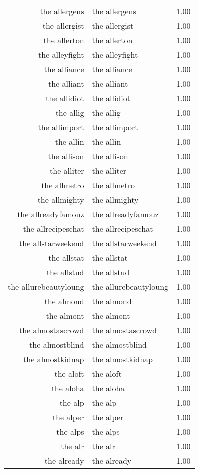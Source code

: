 \begin{table}[ht]
\begin{tabular}{rlr}
  the allergens & the allergens & 1.00 \\ 
  the allergist & the allergist & 1.00 \\ 
  the allerton & the allerton & 1.00 \\ 
  the alleyfight & the alleyfight & 1.00 \\ 
  the alliance & the alliance & 1.00 \\ 
  the alliant & the alliant & 1.00 \\ 
  the allidiot & the allidiot & 1.00 \\ 
  the allig & the allig & 1.00 \\ 
  the allimport & the allimport & 1.00 \\ 
  the allin & the allin & 1.00 \\ 
  the allison & the allison & 1.00 \\ 
  the alliter & the alliter & 1.00 \\ 
  the allmetro & the allmetro & 1.00 \\ 
  the allmighty & the allmighty & 1.00 \\ 
  the allreadyfamouz & the allreadyfamouz & 1.00 \\ 
  the allrecipeschat & the allrecipeschat & 1.00 \\ 
  the allstarweekend & the allstarweekend & 1.00 \\ 
  the allstat & the allstat & 1.00 \\ 
  the allstud & the allstud & 1.00 \\ 
  the allurebeautyloung & the allurebeautyloung & 1.00 \\ 
  the almond & the almond & 1.00 \\ 
  the almont & the almont & 1.00 \\ 
  the almostascrowd & the almostascrowd & 1.00 \\ 
  the almostblind & the almostblind & 1.00 \\ 
  the almostkidnap & the almostkidnap & 1.00 \\ 
  the aloft & the aloft & 1.00 \\ 
  the aloha & the aloha & 1.00 \\ 
  the alp & the alp & 1.00 \\ 
  the alper & the alper & 1.00 \\ 
  the alps & the alps & 1.00 \\ 
  the alr & the alr & 1.00 \\ 
  the already & the already & 1.00 \\ 

\end{tabular}
\end{table}
